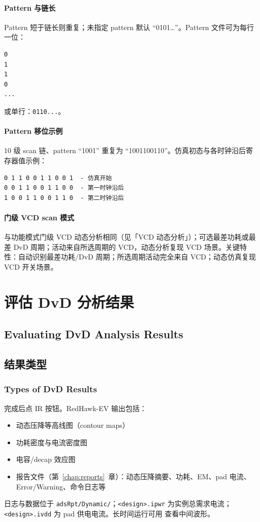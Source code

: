 \paragraph{Pattern 与链长}
Pattern 短于链长则重复；未指定 pattern 默认 ``0101…''。Pattern 文件可为每行一位：
\begin{lstlisting}
0
1
1
0
...
\end{lstlisting}
或单行：\texttt{0110...}。

\paragraph{Pattern 移位示例}
10 级 scan 链、pattern ``1001'' 重复为 ``1001100110''。仿真初态与各时钟沿后寄存器值示例：
\begin{verbatim}
0 1 1 0 0 1 1 0 0 1  - 仿真开始
0 0 1 1 0 0 1 1 0 0  - 第一时钟沿后
1 0 0 1 1 0 0 1 1 0  - 第二时钟沿后
\end{verbatim}

\paragraph{门级 VCD scan 模式}
与功能模式门级 VCD 动态分析相同（见「VCD 动态分析」）；可选最差功耗或最差 DvD 周期；活动来自所选周期的 VCD，动态分析复现 VCD 场景。关键特性：自动识别最差功耗/DvD 周期；所选周期活动完全来自 VCD；动态仿真复现 VCD 开关场景。

\section{评估 DvD 分析结果}
\subsection*{Evaluating DvD Analysis Results}

\subsection{结果类型}
\subsubsection*{Types of DvD Results}

完成后点 IR 按钮。RedHawk-EV 输出包括：
\begin{itemize}
  \item 动态压降等高线图（contour maps）
  \item 功耗密度与电流密度图
  \item 电容/decap 效应图
  \item 报告文件（第~\ref{chap:reports}~章）：动态压降摘要、功耗、EM、pad 电流、Error/Warning、命令日志等
\end{itemize}
日志与数据位于 \texttt{adsRpt/Dynamic/}；\texttt{<design>.ipwr} 为实例总需求电流；\texttt{<design>.ivdd} 为 pad 供电电流。长时间运行可用  查看中间波形。

